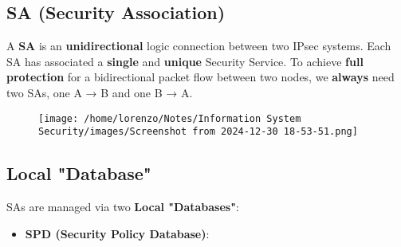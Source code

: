 \subsection{SA (Security Association)}
A \textbf{SA} is an \textbf{unidirectional} logic connection between two IPsec systems. Each SA has associated a \textbf{single} and \textbf{unique} Security Service. To achieve \textbf{full protection} for a bidirectional
packet flow between two nodes, we \textbf{always} need two SAs, one A → B and one B → A.
\begin{figure}[H]
    \centering
    \texttt{[image: /home/lorenzo/Notes/Information System Security/images/Screenshot from 2024-12-30 18-53-51.png]}
\end{figure}

\subsection{Local "Database"}
SAs are managed via two \textbf{Local "Databases"}:
\begin{itemize}
    \item \textbf{SPD (Security Policy Database)}: 
\end{itemize}

